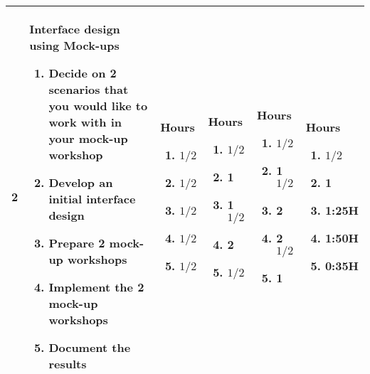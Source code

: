 \begin{left}
\begin{tabular}{ | l | p{5cm} | p{2cm} | p{2cm} | p{2cm} | p{2cm} |}
	
	2 & Interface design using Mock-ups \begin{enumerate}
		\item Decide on 2 scenarios that you would like to work with in your mock-up workshop
		\item Develop an initial interface design
		\item Prepare 2 mock-up workshops
		\item Implement the 2 mock-up workshops
		\item Document the results
	\end{enumerate} & Hours \begin{enumerate} %
		\item $1/2$
		\item $1/2$
		\item $1/2$
		\item $1/2$
		\item $1/2$
	\end{enumerate} & Hours \begin{enumerate} %
		\item $1/2$
		\item 1
		\item 1 $1/2$
		\item 2
		\item $1/2$
	\end{enumerate} & Hours \begin{enumerate} %
		\item $1/2$
		\item 1 $1/2$
		\item 2
		\item 2 $1/2$
		\item 1
	\end{enumerate} & Hours \begin{enumerate} %
		\item $1/2$
		\item 1	
		\item 1:25H
		\item 1:50H
		\item 0:35H
	\end{enumerate} \\ \hline 
	

\end{tabular}
\end{left}
